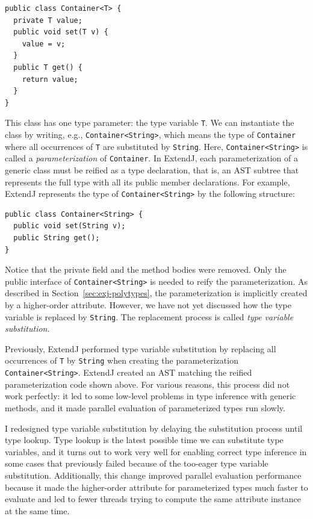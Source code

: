 \documentclass[10pt, twoside, openright]{book}
\newcommand{\secref}[1]{Section~\ref{#1}}
\begin{document}
\begin{lstlisting}
public class Container<T> {
  private T value;
  public void set(T v) {
    value = v;
  }
  public T get() {
    return value;
  }
}
\end{lstlisting}

\noindent
This class has one type parameter: the type variable \verb'T'. We can instantiate the class by
writing, e.g., \verb'Container<String>', which means the type of \verb'Container' where
all occurrences of \verb'T' are substituted by \verb'String'.
Here, \verb'Container<String>' is called a \emph{parameterization} of \verb'Container'.
In ExtendJ, each parameterization of a generic class must be reified as a type declaration,
that is,
an AST subtree that represents the full type with all its public member declarations.
For example, ExtendJ represents the type of \verb'Container<String>' by the following
structure:

\begin{lstlisting}
public class Container<String> {
  public void set(String v);
  public String get();
}
\end{lstlisting}

\noindent
Notice that the private field and the method bodies were removed. Only the public
interface of \verb'Container<String>' is needed to reify the parameterization.
As described in \secref{sec:exj-polytypes}, the parameterization is implicitly created by
a higher-order attribute. However, we have not yet discussed how the type variable
is replaced by \verb'String'. The replacement process is called \emph{type variable substitution}.

Previously, ExtendJ performed type variable substitution by replacing all occurrences of \verb'T'
by \verb'String' when creating the parameterization \verb'Container<String>'. ExtendJ
created an AST matching the reified parameterization code shown above. For various reasons,
this process did not work perfectly: it led to
some low-level problems in type inference with generic methods,
and it made parallel evaluation of parameterized types run slowly.

I redesigned type variable substitution by delaying the substitution process until type lookup.
Type lookup is the latest possible time we can substitute type variables, and
it turns out to work very well for enabling correct type inference in some cases
that previously failed because of
the too-eager type variable substitution. Additionally, this change improved
parallel evaluation performance because it made the higher-order attribute for
parameterized types much faster to evaluate and led to fewer threads trying to
compute the same attribute instance at the same time.
\end{document}
